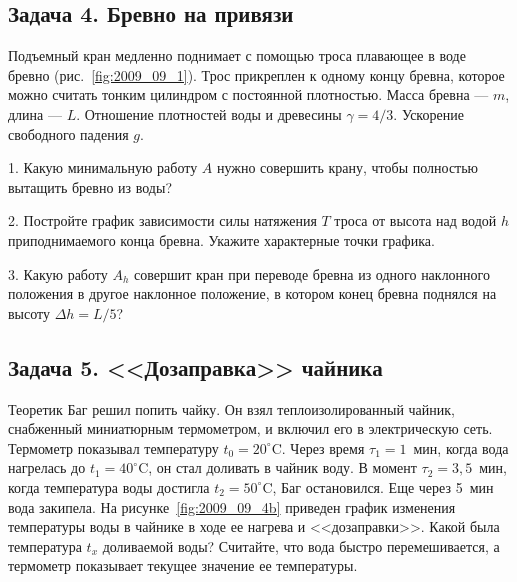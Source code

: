 \subsection*{Задача 4. Бревно на привязи}

Подъемный кран медленно поднимает с помощью троса плавающее в воде
бревно (рис.~\ref{fig:2009_09_1}). Трос прикреплен к одному концу
бревна, которое можно считать тонким цилиндром с постоянной
плотностью. Масса бревна --- $m$, длина --- $L$. Отношение плотностей
воды и древесины $\gamma=4/3$. Ускорение свободного падения $g$.

1. Какую минимальную работу $A$ нужно совершить крану, чтобы полностью
вытащить бревно из воды?

2. Постройте график зависимости силы натяжения $T$ троса от высота над
водой $h$ приподнимаемого конца бревна. Укажите характерные точки
графика.

3. Какую работу $A_h$ совершит кран при переводе бревна из одного
наклонного положения в другое наклонное положение, в котором конец
бревна поднялся на высоту $\Delta h=L/5$?


\subsection*{Задача 5. <<Дозаправка>> чайника}

Теоретик Баг решил попить чайку. Он взял теплоизолированный чайник,
снабженный миниатюрным термометром, и включил его в электрическую
сеть. Термометр показывал температуру $t_0=20^\circ$C. Через время
$\tau_1=1$~мин, когда вода нагрелась до $t_1=40^\circ$C, он стал
доливать в чайник воду. В момент $\tau_2=3{,}5$~мин, когда температура
воды достигла $t_2=50^\circ$C, Баг остановился. Еще через 5~мин вода
закипела. На рисунке~\ref{fig:2009_09_4b} приведен график изменения
температуры воды в чайнике в ходе ее нагрева и <<дозаправки>>. Какой
была температура $t_x$ доливаемой воды? Считайте, что вода быстро
перемешивается, а термометр показывает текущее значение ее
температуры.


